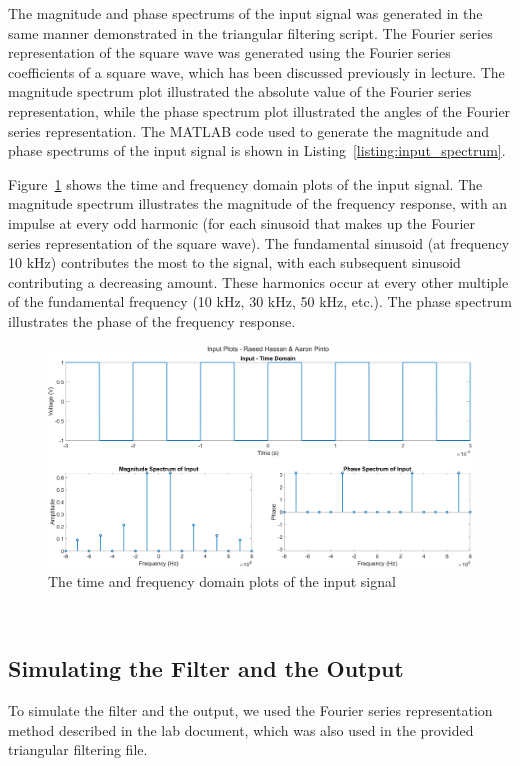 \documentclass[12pt]{article}
\begin{document}
The magnitude and phase spectrums of the input signal was generated in the same manner demonstrated in the triangular filtering script. The Fourier series representation of the square wave was generated using the Fourier series coefficients of a square wave, which has been discussed previously in lecture. The magnitude spectrum plot illustrated the absolute value of the Fourier series representation, while the phase spectrum plot illustrated the angles of the Fourier series representation. The MATLAB code used to generate the magnitude and phase spectrums of the input signal is shown in Listing~\ref{listing:input_spectrum}.


Figure~\ref{fig:input} shows the time and frequency domain plots of the input signal. The magnitude spectrum illustrates the magnitude of the frequency response, with an impulse at every odd harmonic (for each sinusoid that makes up the Fourier series representation of the square wave). The fundamental sinusoid (at frequency 10 kHz) contributes the most to the signal, with each subsequent sinusoid contributing a decreasing amount. These harmonics occur at every other multiple of the fundamental frequency (10 kHz, 30 kHz, 50 kHz, etc.). The phase spectrum illustrates the phase of the frequency response. %
\begin{figure}[h!]
    \includegraphics[width=\textwidth]{input.png}
    \caption{\label{fig:input} The time and frequency domain plots of the input signal}
\end{figure} \\

\subsection*{Simulating the Filter and the Output}
To simulate the filter and the output, we used the Fourier series representation method described in the lab document, which was also used in the provided triangular filtering file. 
\end{document}
